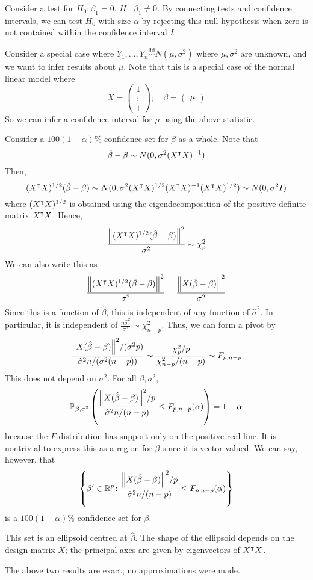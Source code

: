 \begin{example}
	Consider a test for \( H_0 \colon \beta_1 = 0 \), \( H_1 \colon \beta_1 \neq 0 \).
	By connecting tests and confidence intervals, we can test \( H_0 \) with size \( \alpha \) by rejecting this null hypothesis when zero is not contained within the confidence interval \( I \).

	Consider a special case where \( Y_1, \dots, Y_n \overset{\text{iid}}{\sim} N(\mu,\sigma^2) \) where \( \mu, \sigma^2 \) are unknown, and we want to infer results about \( \mu \).
	Note that this is a special case of the normal linear model where
	\[
		X = \begin{pmatrix}
			1      \\
			\vdots \\
			1
		\end{pmatrix};\quad \beta = \begin{pmatrix}
			\mu
		\end{pmatrix}
	\]
	So we can infer a confidence interval for \( \mu \) using the above statistic.
\end{example}
\begin{example}
	Consider a \( 100(1-\alpha)\% \) confidence set for \( \beta \) as a whole.
	Note that
	\[
		\hat \beta - \beta \sim N(0,\sigma^2 (X^\intercal X)^{-1})
	\]
	Then,
	\[
		(X^\intercal X)^{1/2} (\hat \beta - \beta) \sim N(0,\sigma^2(X^\intercal X)^{1/2} (X^\intercal X)^{-1} (X^\intercal X)^{1/2}) \sim N(0,\sigma^2 I)
	\]
	where \( (X^\intercal X)^{1/2} \) is obtained using the eigendecomposition of the positive definite matrix \( X^\intercal X \).
	Hence,
	\[
		\frac{\norm{(X^\intercal X)^{1/2} (\hat \beta - \beta)}^2}{\sigma^2} \sim \chi^2_p
	\]
	We can also write this as
	\[
		\frac{\norm{(X^\intercal X)^{1/2} (\hat \beta - \beta)}^2}{\sigma^2} = \frac{\norm{X(\hat \beta - \beta)}^2}{\sigma^2}
	\]
	Since this is a function of \( \hat \beta \), this is independent of any function of \( \hat \sigma^2 \).
	In particular, it is independent of \( \frac{n\hat\sigma^2}{\sigma^2} \sim \chi^2_{n-p} \).
	Thus, we can form a pivot by
	\[
		\frac{\norm{X(\hat \beta - \beta)}^2 / (\sigma^2 p)}{\hat\sigma^2 n / (\sigma^2(n-p))} \sim \frac{\chi^2_p / p}{\chi^2_{n-p} / (n-p)} \sim F_{p,n-p}
	\]
	This does not depend on \( \sigma^2 \).
	For all \( \beta, \sigma^2 \),
	\[
		\mathbb{P}_{\beta,\sigma^2}\left({
			\frac{\norm{X(\hat \beta - \beta)}^2 / p}{\hat\sigma^2 n / (n-p)}
			\leq F_{p,n-p}(\alpha)}\right) = 1-\alpha
	\]
	because the \( F \) distribution has support only on the positive real line.
	It is nontrivial to express this as a region for \( \beta \) since it is vector-valued.
	We can say, however, that
	\[
		\qty{\beta' \in \mathbb R^p \colon \frac{\norm{X(\hat \beta - \beta)}^2/p}{\hat \sigma^2 n/(n-p)} \leq F_{p,n-p}(\alpha)}
	\]
	is a \( 100(1-\alpha)\% \) confidence set for \( \beta \).

	This set is an ellipsoid centred at \( \hat \beta \).
	The shape of the ellipsoid depends on the design matrix \( X \); the principal axes are given by eigenvectors of \( X^\intercal X \).
\end{example}
The above two results are exact; no approximations were made.

